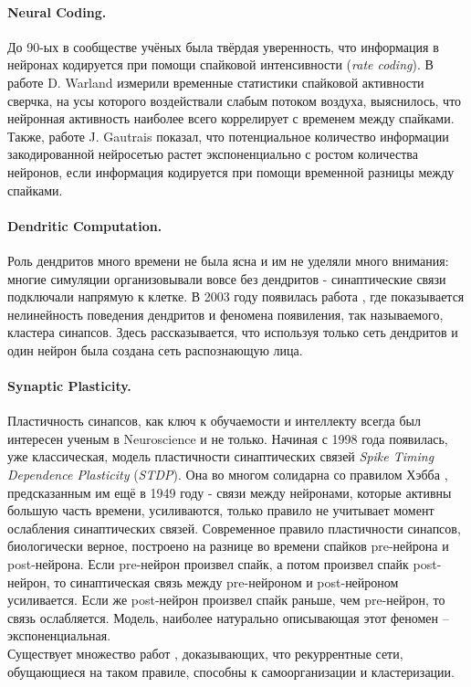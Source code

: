 \documentclass[a4paper,10pt]{article}
\begin{document}
\paragraph*{Neural Coding.} До 90-ых в сообществе учёных была твёрдая уверенность, что информация в нейронах кодируется при помощи спайковой интенсивности (\textit{rate coding}). В работе D. Warland \cite{time_cricket} измерили временные статистики спайковой активности сверчка, на усы которого воздействали слабым потоком воздуха, выяснилось, что нейронная активность наиболее всего коррелирует с временем между спайками. Также, работе J. Gautrais \cite{time_code} показал, что потенциальное количество информации закодированной нейросетью растет экспоненциально с ростом количества нейронов, если информация кодируется при помощи временной разницы между спайками.\\
\paragraph*{Dendritic Computation.}
Роль дендритов много времени не была ясна и им не уделяли много внимания: многие симуляции организовывали вовсе без дендритов - синаптические связи подключали напрямую к клетке. В 2003 году появилась работа \cite{dendr0}, где показывается нелинейность поведения дендритов и феномена появиления, так называемого, кластера синапсов. Здесь \cite{dendr1} рассказывается, что используя только сеть дендритов и один нейрон была создана сеть распознающую лица.
\paragraph*{Synaptic Plasticity.}
Пластичность синапсов, как ключ к обучаемости и интеллекту всегда был интересен ученым в Neuroscience и не только. Начиная с 1998 года появилась, уже классическая, модель пластичности синаптических связей \cite{syn0} \textit{Spike Timing Dependence Plasticity} (\textit{STDP}). Она во многом солидарна со правилом Хэбба \cite{hebb}, предсказанным им ещё в 1949 году - связи между нейронами, которые активны большую часть времени, усиливаются, только правило не учитывает момент ослабления синаптических связей. Современное правило пластичности синапсов, биологически верное, построено на разнице во времени спайков pre-нейрона и post-нейрона. Если pre-нейрон произвел спайк, а потом произвел спайк post-нейрон, то синаптическая связь между pre-нейроном и post-нейроном усиливается. Если же post-нейрон произвел спайк раньше, чем pre-нейрон, то связь ослабляется. Модель, наиболее натурально описывающая этот феномен -- экспоненциальная.\\
\indent Существует множество работ \cite{syn1}\cite{syn2}\cite{syn3}, доказывающих, что рекуррентные сети, обущающиеся на таком правиле, способны к самоорганизации и кластеризации.
\end{document}

